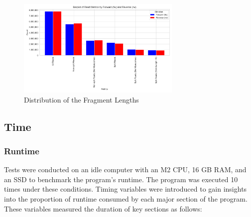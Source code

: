\documentclass{article}
\begin{document}
    \begin{figure}
        \centering
        \includegraphics[width=0.7\textwidth]{figures/readsimulator/barplot_read_metrics}
        \caption{Distribution of the Fragment Lengths}
        \label{fig:read-bar-plot}
    \end{figure}

    \subsection{Time}

    \subsubsection{Runtime}
    Tests were conducted on an idle computer with an M2 CPU, 16 GB RAM, and an SSD to benchmark the program's runtime. The program was executed 10 times under these conditions. Timing variables were introduced to gain insights into the proportion of runtime consumed by each major section of the program. These variables measured the duration of key sections as follows:
\end{document}
